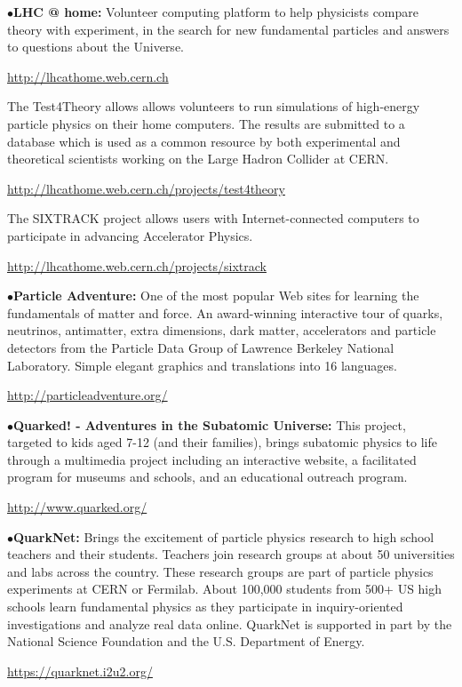 \smallskip

\item{$\bullet$}{\bf LHC @ home:}
Volunteer computing platform to help physicists compare theory with experiment, in the search for new fundamental particles and answers to questions about the Universe.
	\item{}\qquad\url{http://lhcathome.web.cern.ch}

\smallskip

\item{}The Test4Theory allows allows volunteers to run simulations of high-energy particle physics on their home computers. The results are submitted to a database which is used as a common resource by both experimental and theoretical scientists working on the Large Hadron Collider at CERN.
	\item{}\qquad\url{http://lhcathome.web.cern.ch/projects/test4theory}

\smallskip

\item{}The SIXTRACK project allows users with Internet-connected computers to participate in advancing Accelerator Physics.

	\item{}\qquad\url{http://lhcathome.web.cern.ch/projects/sixtrack}

\smallskip

\item{$\bullet$}{\bf Particle Adventure:} 
One of the most popular Web sites for learning the fundamentals of matter and force. An award-winning interactive tour of quarks, neutrinos, antimatter, extra dimensions, dark matter, accelerators and particle detectors from the Particle Data Group of Lawrence Berkeley National Laboratory. Simple elegant graphics and translations into 16 languages.
	\item{}\qquad\url{http://particleadventure.org/}

\smallskip

\item{$\bullet$}{\bf Quarked! - Adventures in the Subatomic Universe:}
This project, targeted to kids aged 7-12 (and their families), brings subatomic physics to life through a multimedia project including an interactive website, a facilitated program for museums and schools, and an educational outreach program.
	\item{}\qquad\url{http://www.quarked.org/}

\smallskip

\item{$\bullet$}{\bf QuarkNet:} 
Brings the excitement of particle physics research to high school teachers and their students. Teachers join research groups at about 50 universities and labs across the country. These research groups are part of particle physics experiments at CERN or Fermilab. About 100,000 students from 500+ US high schools learn fundamental physics as they participate in inquiry-oriented investigations and analyze real data online. QuarkNet is supported in part by the National Science Foundation and the U.S. Department of Energy.
	\item{}\qquad\url{https://quarknet.i2u2.org/}

